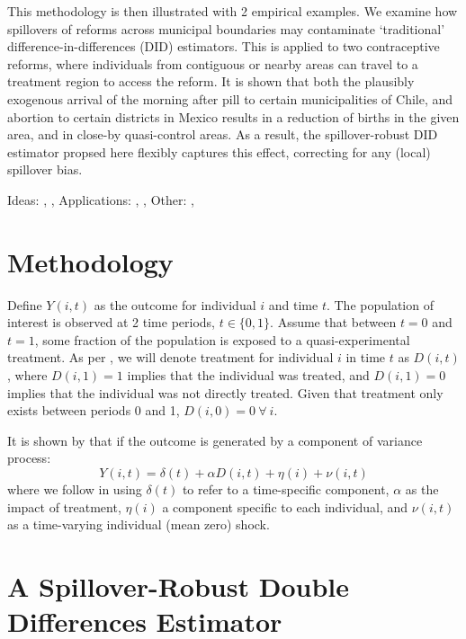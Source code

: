 \documentclass{article}
\begin{document}
This methodology is then illustrated with 2 empirical examples.  We examine how
spillovers of reforms across municipal boundaries may contaminate `traditional' 
difference-in-differences (DID) estimators.  This is applied to two contraceptive
reforms, where individuals from contiguous or nearby areas can travel to a 
treatment region to access the reform.  It is shown that both the plausibly 
exogenous arrival of the morning after pill to certain municipalities of Chile, 
and abortion to certain districts in Mexico results in a reduction of births
in the given area, and in close-by quasi-control areas.  As a result, the
spillover-robust DID estimator propsed here flexibly captures this effect, 
correcting for any (local) spillover bias.



Ideas: \citet{McIntosh2008}, \citet{Bairdetal2014}, \citet{AngelucciDiMaro2010} 
Applications: \citet{AngelucciDeGiorgi2009}, \citet{Heckmanetal1998}, 
\citet{MiguelKremer2004}
Other: \citet{Imbens2004}, \citet{Heckmanetal1998b}

\section{Methodology}
Define $Y(i,t)$ as the outcome for individual $i$ and time $t$.  The population
of interest is observed at 2 time periods, $t\in \{0,1\}$.  Assume that between
$t=0$ and $t=1$, some fraction of the population is exposed to a 
quasi-experimental treatment.  As per \citet{Abadie2005}, we will denote 
treatment for individual $i$ in time $t$ as $D(i,t)$, where $D(i,1)=1$ implies 
that the individual was treated, and $D(i,1)=0$ implies that the individual was
not directly treated.  Given that treatment only exists between periods 0 and 1,
$D(i,0)=0\ \forall\ i$.

It is shown by \citet{AshenfelterCard1985} that if the outcome is generated by
a component of variance process:
\begin{equation}
Y(i,t)=\delta(t) + \alpha D(i,t)+\eta(i)+\nu(i,t)
\end{equation}
where we follow \citet{Abadie2005} in using $\delta(t)$ to refer to a time-specific
component, $\alpha$ as the impact of treatment, $\eta(i)$ a component specific
to each individual, and $\nu(i,t)$ as a time-varying individual (mean zero) shock.

\section{A Spillover-Robust Double Differences Estimator}
\end{document}
